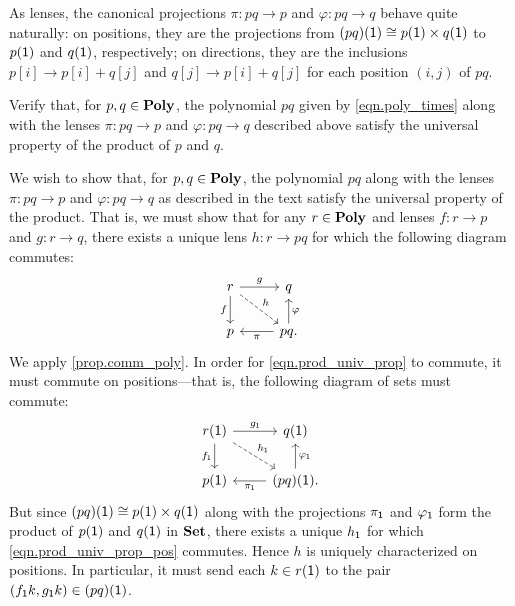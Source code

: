 \documentclass[Book-Poly]{subfiles}
\begin{document}
As lenses, the canonical projections $\pi \colon pq \to p$ and $\varphi \colon pq \to q$ behave quite naturally: on positions, they are the projections from $(pq)(\textsf{1}) \cong p(\textsf{1}) \times q(\textsf{1})$ to $p(\textsf{1})$ and $q(\textsf{1})$, respectively; on directions, they are the inclusions $p[i] \to p[i] + q[j]$ and $q[j] \to p[i] + q[j]$ for each position $(i, j)$ of $pq$.

\begin{exercise} \label{exc.poly_prod}
  Verify that, for $p, q \in \mathbf{Poly}$, the polynomial $pq$ given by \eqref{eqn.poly_times} along with the lenses $\pi \colon pq \to p$ and $\varphi \colon pq \to q$ described above satisfy the universal property of the product of $p$ and $q$.
  \begin{solution}
    We wish to show that, for $p, q \in \mathbf{Poly}$, the polynomial $pq$ along with the lenses $\pi \colon pq \to p$ and $\varphi \colon pq \to q$ as described in the text satisfy the universal property of the product.
    That is, we must show that for any $r \in \mathbf{Poly}$ and lenses $f \colon r \to p$ and $g \colon r \to q$, there exists a unique lens $h \colon r \to pq$ for which the following diagram commutes:
    \begin{equation} \label{eqn.prod_univ_prop}
      \begin{tikzcd}
        r \ar[d, "f"'] \ar[r, "g"] \ar[dr, "h", dashed] & q \\
        p & pq. \ar[l, "\pi"] \ar[u, "\varphi"']
      \end{tikzcd}
    \end{equation}
    We apply \cref{prop.comm_poly}.
    In order for \eqref{eqn.prod_univ_prop} to commute, it must commute on positions---that is, the following diagram of sets must commute:
    \begin{equation} \label{eqn.prod_univ_prop_pos}
      \begin{tikzcd}
        r(\1) \ar[d, "f_\1"'] \ar[r, "g_\1"] \ar[dr, "h_\1", dashed] & q(\1) \\
        p(\1) & (pq)(\1). \ar[l, "\pi_\1"] \ar[u, "\varphi_\1"']
      \end{tikzcd}
    \end{equation}
    But since $(pq)(\textsf{1}) \cong p(1) \times q(\textsf{1})$ along with the projections $\pi_{\textsf{1}}$ and $\varphi_{\textsf{1}}$ form the product of $p(\textsf{1})$ and $q(\textsf{1})$ in $\mathbf{Set}$, there exists a unique $h_{\textsf{1}}$ for which \eqref{eqn.prod_univ_prop_pos} commutes.
    Hence $h$ is uniquely characterized on positions.
    In particular, it must send each $k \in r(\textsf{1})$ to the pair $(f_{\textsf{1}}k, g_{\textsf{1}}k) \in (pq)(\textsf{1})$.


\end{solution}
\end{exercise}
\end{document}
